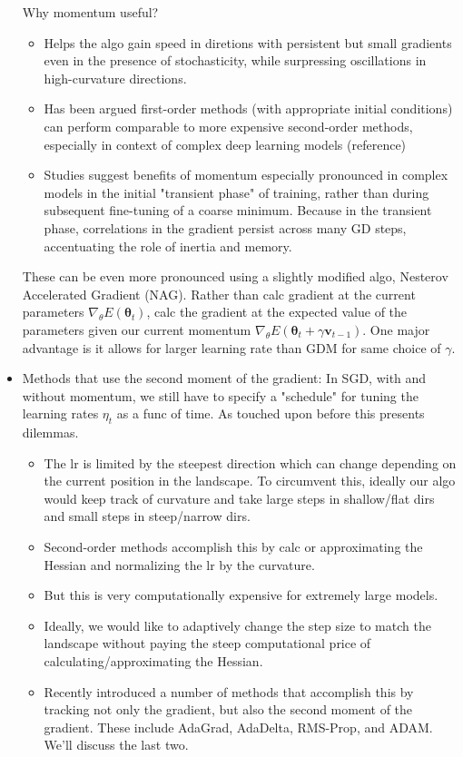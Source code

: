 \documentclass[norsk,a4paper,11pt]{article}
\begin{document}
\begin{itemize}
		Why momentum useful?
		\begin{itemize}
			\item Helps the algo gain speed in diretions with persistent but small gradients even in the presence of stochasticity, while surpressing oscillations in high-curvature directions.
			\item Has been argued first-order methods (with appropriate initial conditions) can perform comparable to more expensive second-order methods, especially in context of complex deep learning models (reference)
			\item Studies suggest benefits of momentum especially pronounced in complex models in the initial "transient phase" of training, rather than during subsequent fine-tuning of a coarse minimum. Because in the transient phase, correlations in the gradient persist across many GD steps, accentuating the role of inertia and memory.			
		\end{itemize}
		These can be even more pronounced using a slightly modified algo, Nesterov Accelerated Gradient (NAG). Rather than calc gradient at the current parameters $\nabla_\theta E(\bm{\theta}_t)$, calc the gradient at the expected value of the parameters given our current momentum $\nabla_\theta E(\bm{\theta}_t + \gamma \mathbf{v}_{t-1})$. One major advantage is it allows for larger learning rate than GDM for same choice of $\gamma$.

		\item Methods that use the second moment of the gradient:
		In SGD, with and without momentum, we still have to specify a "schedule" for tuning the learning rates $\eta_t$ as a func of time. As touched upon before this presents dilemmas. 
		\begin{itemize}
			\item The lr is limited by the steepest direction which can change depending on the current position in the landscape. To circumvent this, ideally our algo would keep track of curvature and take large steps in shallow/flat dirs and small steps in steep/narrow dirs.
			\item Second-order methods accomplish this by calc or approximating the Hessian and normalizing the lr by the curvature.
			\item But this is very computationally expensive for extremely large models.
			\item Ideally, we would like to adaptively change the step size to match the landscape without paying the steep computational price of calculating/approximating the Hessian.
			\item Recently introduced a number of methods that accomplish this by tracking not only the gradient, but also the second moment of the gradient. These include AdaGrad, AdaDelta, RMS-Prop, and ADAM. We'll discuss the last two.
		\end{itemize}


\end{itemize}
\end{document}
